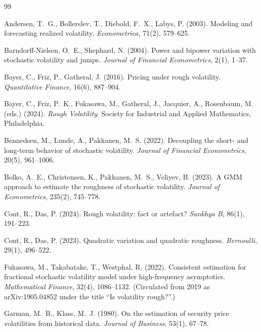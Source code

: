 \documentclass[11pt]{article}
\begin{document}
\begin{thebibliography}{99}

 Andersen, T.~G., Bollerslev, T., Diebold, F.~X., Labys, P.
(2003). Modeling and forecasting realized volatility. \emph{Econometrica}, 71(2),
579--625.

 Barndorff-Nielsen, O.~E., Shephard, N. (2004). Power and bipower
variation with stochastic volatility and jumps. \emph{Journal of Financial
Econometrics}, 2(1), 1--37.

 Bayer, C., Friz, P., Gatheral, J. (2016). Pricing under rough
volatility. \emph{Quantitative Finance}, 16(6), 887--904.

 Bayer, C., Friz, P.~K., Fukasawa, M., Gatheral, J.,
Jacquier, A., Rosenbaum, M. (eds.) (2024). \emph{Rough Volatility}. Society for
Industrial and Applied Mathematics, Philadelphia.

 Bennedsen, M., Lunde, A., Pakkanen, M.~S. (2022). Decoupling the
short- and long-term behavior of stochastic volatility. \emph{Journal of Financial
Econometrics}, 20(5), 961--1006.

 Bolko, A.~E., Christensen, K., Pakkanen, M.~S., Veliyev, B.
(2023). A GMM approach to estimate the roughness of stochastic volatility.
\emph{Journal of Econometrics}, 235(2), 745--778.

 Cont, R., Das, P. (2024). Rough volatility: fact or artefact?
\emph{Sankhya B}, 86(1), 191--223.

 Cont, R., Das, P. (2023). Quadratic variation and quadratic
roughness. \emph{Bernoulli}, 29(1), 496--522.

 Fukasawa, M., Takabatake, T., Westphal, R. (2022). Consistent
estimation for fractional stochastic volatility model under high-frequency
asymptotics. \emph{Mathematical Finance}, 32(4), 1086--1132. (Circulated from
2019 as arXiv:1905.04852 under the title ``Is volatility rough?''.)

 Garman, M.~B., Klass, M.~J. (1980). On the estimation of security
price volatilities from historical data. \emph{Journal of Business}, 53(1), 67--78.


\end{thebibliography}
\end{document}
